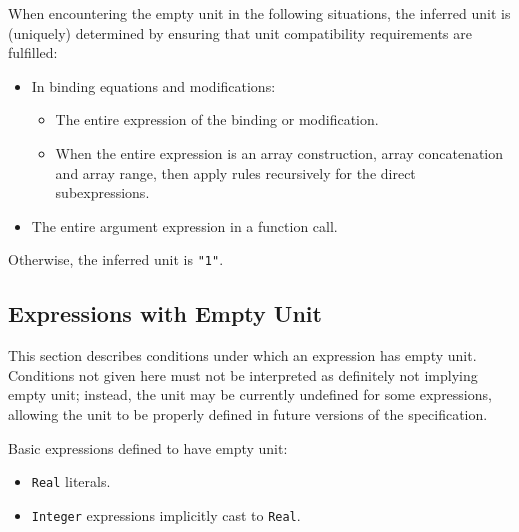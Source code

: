 When encountering the empty unit in the following situations, the inferred unit is (uniquely) determined by ensuring that unit compatibility requirements are fulfilled:
\begin{itemize}
\item
  In binding equations and modifications:
  \begin{itemize}
  \item The entire expression of the binding or modification.
  \item When the entire expression is an array construction, array concatenation and array range, then apply rules recursively for the direct subexpressions.
  \end{itemize}
\item
  The entire argument expression in a function call.
\end{itemize}

Otherwise, the inferred unit is \lstinline!"1"!.


\subsection{Expressions with Empty Unit}\label{expressions-with-empty-unit}

This section describes conditions under which an expression has empty unit.
Conditions not given here must not be interpreted as definitely not implying empty unit; instead, the unit may be currently undefined for some expressions, allowing the unit to be properly defined in future versions of the specification.

Basic expressions defined to have empty unit:
\begin{itemize}
\item
  \lstinline!Real! literals.
\item
  \lstinline!Integer! expressions implicitly cast to \lstinline!Real!.
\end{itemize}

